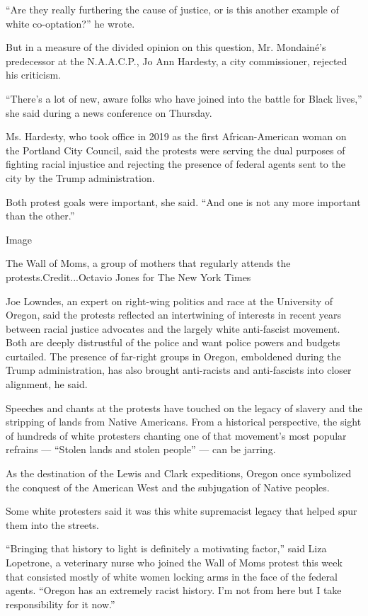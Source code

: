 ``Are they really furthering the cause of justice, or is this another
example of white co-optation?'' he wrote.

But in a measure of the divided opinion on this question, Mr. Mondainé's
predecessor at the N.A.A.C.P., Jo Ann Hardesty, a city commissioner,
rejected his criticism.

``There's a lot of new, aware folks who have joined into the battle for
Black lives,'' she said during a news conference on Thursday.

Ms. Hardesty, who took office in 2019 as the first African-American
woman on the Portland City Council, said the protests were serving the
dual purposes of fighting racial injustice and rejecting the presence of
federal agents sent to the city by the Trump administration.

Both protest goals were important, she said. ``And one is not any more
important than the other.''

Image

The Wall of Moms, a group of mothers that regularly attends the
protests.Credit...Octavio Jones for The New York Times

Joe Lowndes, an expert on right-wing politics and race at the University
of Oregon, said the protests reflected an intertwining of interests in
recent years between racial justice advocates and the largely white
anti-fascist movement. Both are deeply distrustful of the police and
want police powers and budgets curtailed. The presence of far-right
groups in Oregon, emboldened during the Trump administration, has also
brought anti-racists and anti-fascists into closer alignment, he said.

Speeches and chants at the protests have touched on the legacy of
slavery and the stripping of lands from Native Americans. From a
historical perspective, the sight of hundreds of white protesters
chanting one of that movement's most popular refrains --- ``Stolen lands
and stolen people'' --- can be jarring.

As the destination of the Lewis and Clark expeditions, Oregon once
symbolized the conquest of the American West and the subjugation of
Native peoples.

Some white protesters said it was this white supremacist legacy that
helped spur them into the streets.

``Bringing that history to light is definitely a motivating factor,''
said Liza Lopetrone, a veterinary nurse who joined the Wall of Moms
protest this week that consisted mostly of white women locking arms in
the face of the federal agents. ``Oregon has an extremely racist
history. I'm not from here but I take responsibility for it now.''

